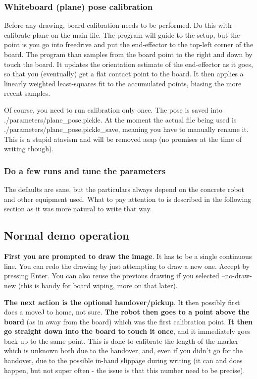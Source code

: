 \documentclass{article}
\begin{document}
\subsubsection{Whiteboard (plane) pose calibration}
Before any drawing, board calibration needs to be performed. Do this with --calibrate-plane
on the main file.
The program will guide to the setup, but the point is you go into freedrive
and put the end-effector to the top-left corner of the board.
The program than samples from the board point to the right and down
by touch the board. It updates the orientation estimate of the end-effector as it goes,
so that you (eventually) get a flat contact point to the board.
It then applies a linearly weighted least-squares fit to the accumulated points,
biasing the more recent samples.

Of course, you need to run calibration only once. The pose is saved
into ./parameters/plane\_pose.pickle. 
At the moment the actual file being used is ./parameters/plane\_pose.pickle\_save,
meaning you have to manually rename it. This is a stupid atavism and will 
be removed asap (no promises at the time of writing though).

\subsubsection{Do a few runs and tune the parameters}
The defaults are sane, but the particulars always depend
on the concrete robot and other equipment used.
What to pay attention to is described in the following section
as it was more natural to write that way.


\subsection{Normal demo operation}
\textbf{First you are prompted to draw the image}. It has to be a single
continuous line. You can redo the drawing by just attempting to draw
a new one. Accept by pressing Enter.
You can also reuse the previous drawing if you selected --no-draw-new
(this is handy for board wiping, more on that later).

\textbf{The next action is the optional handover/pickup}.
It then possibly first does a moveJ to home, not sure.
\textbf{The robot then goes to a point above  the board} (as in away from the board) which was the first 
calibration point. \textbf{It then go straight down into the board
to touch it once}, and it immediately goes back up to the same point.
This is done to calibrate the length of the marker which is unknown
both due to the handover, and, even if you didn't go for the handover,
due to the possible in-hand slippage during writing (it can and does happen,
but not super often - the issue is that this number need to be precise).
\end{document}
